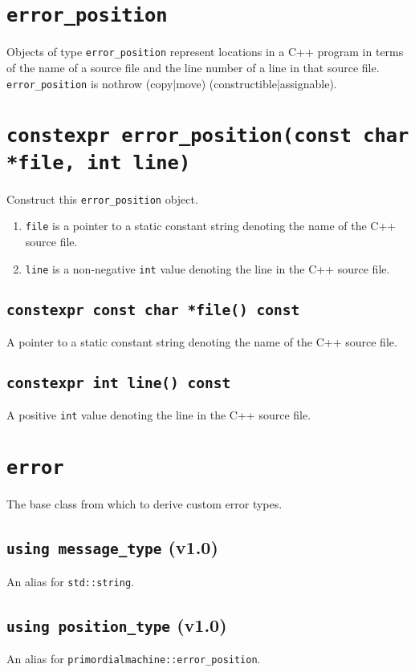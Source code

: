 \documentclass[oneside]{book}
\begin{document}
\section{\texttt{error\_position}}
Objects of type \texttt{error\_position} represent locations in a C++ program in terms of the   name
of a source file and the line number of a line in that source file. \texttt{error\_position}      is
nothrow (copy|move) (constructible|assignable).

\section{\texttt{constexpr error\_position(const char *file, int line)}}
Construct this \texttt{error\_position} object.
\begin{enumerate}
   \item\texttt{file} is a pointer to a static constant string denoting the name of the C++ source file.
   \item\texttt{line} is a non-negative \texttt{int} value denoting the line in the C++ source file.
\end{enumerate}

\subsection{\texttt{constexpr const char *file() const}}
A pointer to a static constant string denoting the name of the C++ source file.

\subsection{\texttt{constexpr int line() const}}
A positive \texttt{int} value denoting the line in the C++ source file.
\section{\texttt{error}}
The base class from which to derive custom error types.

\subsection{\texttt{using message\_type} (v1.0)}
An alias for \texttt{std::string}.

\subsection{\texttt{using position\_type} (v1.0)}
An alias for \texttt{primordialmachine::error\_position}.
\end{document}
